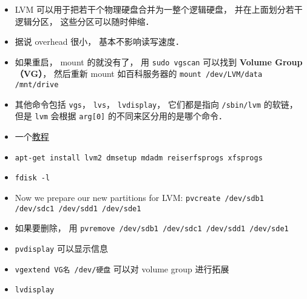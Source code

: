 
\begin{issues}
\issueDraft
\end{issues}


\begin{itemize}
\item LVM 可以用于把若干个物理硬盘合并为一整个逻辑硬盘， 并在上面划分若干逻辑分区， 这些分区可以随时伸缩．
\item 据说 overhead 很小， 基本不影响读写速度．
\item 如果重启， mount 的就没有了， 用 \verb`sudo vgscan` 可以找到 \textbf{Volume Group（VG）}， 然后重新 mount 如百科服务器的 \verb`mount /dev/LVM/data /mnt/drive`
\item 其他命令包括 \verb|vgs|， \verb|lvs|， \verb|lvdisplay|， 它们都是指向 \verb|/sbin/lvm| 的软链， 但是 \verb|lvm| 会根据 \verb|arg[0]| 的不同来区分用的是哪个命令．
\end{itemize}

\begin{itemize}
\item 一个\href{https://www.howtoforge.com/linux_lvm}{教程}
\item \verb|apt-get install lvm2 dmsetup mdadm reiserfsprogs xfsprogs|
\item \verb|fdisk -l|
\item Now we prepare our new partitions for LVM: \verb|pvcreate /dev/sdb1 /dev/sdc1 /dev/sdd1 /dev/sde1|
\item 如果要删除， 用 \verb|pvremove /dev/sdb1 /dev/sdc1 /dev/sdd1 /dev/sde1|
\item \verb|pvdisplay| 可以显示信息
\item \verb|vgextend VG名 /dev/硬盘| 可以对 volume group 进行拓展
\item \verb|lvdisplay|
\end{itemize}
